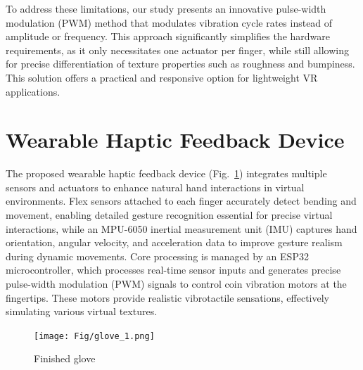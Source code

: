 \documentclass[a4paper,twocolumn]{article}
\begin{document}
To address these limitations, our study presents an innovative pulse-width modulation (PWM) method that modulates vibration cycle rates instead of amplitude or frequency. This approach significantly simplifies the hardware requirements, as it only necessitates one actuator per finger, while still allowing for precise differentiation of texture properties such as roughness and bumpiness. This solution offers a practical and responsive option for lightweight VR applications.



\section{Wearable Haptic Feedback Device}
The proposed wearable haptic feedback device (Fig.~\ref{fig:finalglove}) integrates multiple sensors and actuators to enhance natural hand interactions in virtual environments. Flex sensors attached to each finger accurately detect bending and movement, enabling detailed gesture recognition essential for precise virtual interactions, while an MPU-6050 inertial measurement unit (IMU) captures hand orientation, angular velocity, and acceleration data to improve gesture realism during dynamic movements. Core processing is managed by an ESP32 microcontroller, which processes real-time sensor inputs and generates precise pulse-width modulation (PWM) signals to control coin vibration motors at the fingertips. These motors provide realistic vibrotactile sensations, effectively simulating various virtual textures. 

\begin{figure}[H]
  \centering
	\texttt{[image: Fig/glove\_1.png]}%
	\caption{Finished glove}\label{fig:finalglove}%
\end{figure}
\end{document}
